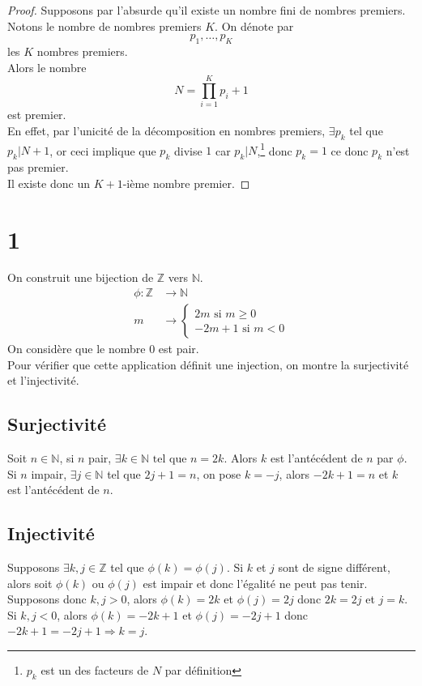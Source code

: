 \documentclass[11pt, a4paper, twoside]{article}
\begin{document}
\begin{proof}
	Supposons par l'absurde qu'il existe un nombre fini de nombres premiers. Notons le nombre de nombres premiers $K$. On dénote par
	\[ 
	p_1,\ldots,p_K
	\]
	les $K$ nombres premiers.\\
	Alors le nombre
	\[ 
	N=\prod_{i=1} ^{K} p_i + 1
	\]
	est premier.\\
	En effet, par l'unicité de la décomposition en nombres premiers, $\exists p_k$ tel que $p_k | N+1$, or ceci implique que $p_k$ divise $1$ car $p_k | N$,\footnote{$p_k$ est un des facteurs de $N$ par définition} donc $p_k=1$ ce donc $p_k$ n'est pas premier. \\
	Il existe donc un $K+1$-ième nombre premier.
	
\end{proof}
\section*{1}
On construit une bijection de $\mathbb{Z}$ vers $\mathbb{N}$.\\
\begin{align*}
	\phi \colon \mathbb{Z} &\to \mathbb{N}\\
	m & \to 
	\begin{cases}
	2m \text{ si } m \geq 0\\
	-2m +1 \text{ si } m < 0
	\end{cases}
\end{align*}
On considère que le nombre 0 est pair.\\
Pour vérifier que cette application définit une injection, on montre la surjectivité et l'injectivité.\\
\subsection*{Surjectivité}
Soit $n \in \mathbb{N}$, si $n$ pair, $\exists k \in \mathbb{N} \text{ tel que } n = 2k$. Alors $k$ est l'antécédent de $n$ par $\phi$.\\
Si $n$ impair, $\exists j \in \mathbb{N}$ tel que $2j+1=n$, on pose $k=-j$, alors $-2k+1 =n$ et $k$ est l'antécédent de $n$.
\subsection*{Injectivité}
Supposons $\exists k,j \in \mathbb{Z}$ tel que $\phi(k)=\phi(j)$. Si $k$ et $j$ sont de signe différent, alors soit $\phi(k)$ ou $\phi(j)$ est impair et donc l'égalité ne peut pas tenir.\\
Supposons donc $k, j  > 0$, alors $\phi(k) = 2k $ et $\phi(j) = 2j$ donc $2k=2j$ et $j=k$.\\
Si $k, j <0 $, alors $\phi(k) = -2k + 1$ et $\phi(j) = -2j +1$ donc $-2k+1 = -2j + 1 \Rightarrow k =j$.	\\
\end{document}
